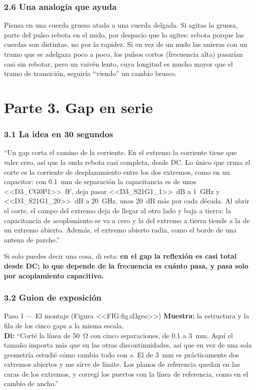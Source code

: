 \documentclass[11pt,letterpaper]{article}
\begin{document}
\section*{2.6 Una analogía que ayuda}
Piensa en una cuerda gruesa atada a una cuerda delgada. Si agitas la gruesa, parte del pulso rebota en el nudo, por despacio que lo agites: rebota porque las cuerdas son distintas, no por la rapidez. Si en vez de un nudo las unieras con un tramo que se adelgaza poco a poco, los pulsos cortos (frecuencia alta) pasarían casi sin rebotar, pero un vaivén lento, cuya longitud es mucho mayor que el tramo de transición, seguiría ``viendo'' un cambio brusco.

\newpage
\part*{Parte 3. Gap en serie}

\section*{3.1 La idea en 30 segundos}
\begin{idea}
``Un gap corta el camino de la corriente. En el extremo la corriente tiene que valer cero, así que la onda rebota casi completa, desde DC. Lo único que cruza el corte es la corriente de desplazamiento entre los dos extremos, como en un capacitor: con \SI{0.1}{mm} de separación la capacitancia es de unos \SI{<<D3_CG0P1>>}{fF}, deja pasar \SI{<<D3_S21G1_1>>}{dB} a \SI{1}{GHz} y \SI{<<D3_S21G1_20>>}{dB} a \SI{20}{GHz}, unos 20~dB más por cada década. Al abrir el corte, el campo del extremo deja de llegar al otro lado y baja a tierra: la capacitancia de acoplamiento se va a cero y la del extremo a tierra tiende a la de un extremo abierto. Además, el extremo abierto radia, como el borde de una antena de parche.''
\end{idea}

Si solo puedes decir una cosa, di esta: \textbf{en el gap la reflexión es casi total desde DC; lo que depende de la frecuencia es cuánto pasa, y pasa solo por acoplamiento capacitivo.}

\section*{3.2 Guion de exposición}

\begin{paso}{Paso 1 --- El montaje (Figura <<FIG:fig:d3geo>>)}
\textbf{Muestra:} la estructura y la fila de los cinco gaps a la misma escala.\\
\textbf{Di:} ``Corté la línea de \SI{50}{\ohm} con cinco separaciones, de \SI{0.1}{} a \SI{3}{mm}. Aquí el tamaño importa más que en las otras discontinuidades, así que en vez de una sola geometría estudié cómo cambia todo con $s$. El de \SI{3}{mm} es prácticamente dos extremos abiertos y me sirve de límite. Los planos de referencia quedan en las caras de los extremos, y corregí los puertos con la línea de referencia, como en el cambio de ancho.''
\end{paso}
\end{document}

